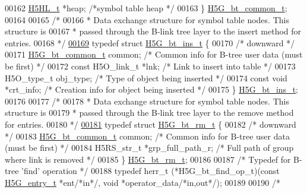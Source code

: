 \begin{DoxyCode}
00162     \hyperlink{struct_h5_h_l__t}{H5HL\_t} *heap;                       \textcolor{comment}{/*symbol table heap            */}
00163 \} \hyperlink{struct_h5_g__bt__common__t}{H5G\_bt\_common\_t};
00164 
00165 \textcolor{comment}{/*}
00166 \textcolor{comment}{ * Data exchange structure for symbol table nodes.  This structure is}
00167 \textcolor{comment}{ * passed through the B-link tree layer to the insert method for entries.}
00168 \textcolor{comment}{ */}
\hyperlink{struct_h5_g__bt__ins__t}{00169} \textcolor{keyword}{typedef} \textcolor{keyword}{struct }\hyperlink{struct_h5_g__bt__ins__t}{H5G\_bt\_ins\_t} \{
00170     \textcolor{comment}{/* downward */}
00171     \hyperlink{struct_h5_g__bt__common__t}{H5G\_bt\_common\_t} common;             \textcolor{comment}{/* Common info for B-tree user data (must be first) 
      */}
00172     \textcolor{keyword}{const} H5O\_link\_t *lnk;              \textcolor{comment}{/* Link to insert into table         */}
00173     H5O\_type\_t obj\_type;                \textcolor{comment}{/* Type of object being inserted */}
00174     \textcolor{keyword}{const} \textcolor{keywordtype}{void} *crt\_info;               \textcolor{comment}{/* Creation info for object being inserted */}
00175 \} \hyperlink{struct_h5_g__bt__ins__t}{H5G\_bt\_ins\_t};
00176 
00177 \textcolor{comment}{/*}
00178 \textcolor{comment}{ * Data exchange structure for symbol table nodes.  This structure is}
00179 \textcolor{comment}{ * passed through the B-link tree layer to the remove method for entries.}
00180 \textcolor{comment}{ */}
\hyperlink{struct_h5_g__bt__rm__t}{00181} \textcolor{keyword}{typedef} \textcolor{keyword}{struct }\hyperlink{struct_h5_g__bt__rm__t}{H5G\_bt\_rm\_t} \{
00182     \textcolor{comment}{/* downward */}
00183     \hyperlink{struct_h5_g__bt__common__t}{H5G\_bt\_common\_t} common;         \textcolor{comment}{/* Common info for B-tree user data (must be first) */}
00184     H5RS\_str\_t *grp\_full\_path\_r;    \textcolor{comment}{/* Full path of group where link is removed */}
00185 \} \hyperlink{struct_h5_g__bt__rm__t}{H5G\_bt\_rm\_t};
00186 
00187 \textcolor{comment}{/* Typedef for B-tree 'find' operation */}
00188 \textcolor{keyword}{typedef} herr\_t (*H5G\_bt\_find\_op\_t)(\textcolor{keyword}{const} \hyperlink{struct_h5_g__entry__t}{H5G\_entry\_t} *ent\textcolor{comment}{/*in*/}, \textcolor{keywordtype}{void} *operator\_data\textcolor{comment}{/*in,out*/});
00189 
00190 \textcolor{comment}{/*}

\end{DoxyCode}
